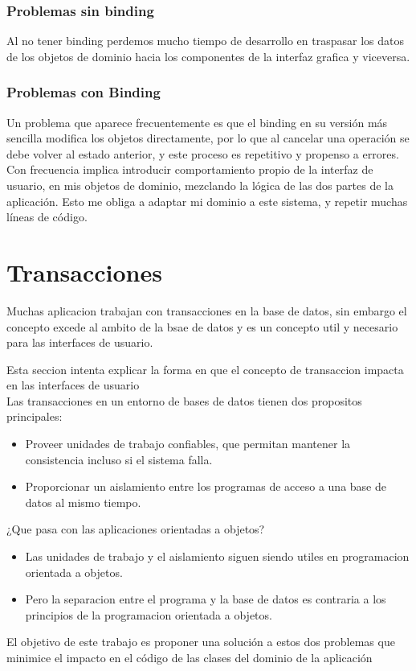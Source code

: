 \subsubsection{Problemas sin binding}
Al no tener binding perdemos mucho tiempo de desarrollo en  traspasar los datos
de los objetos de dominio hacia los componentes de la interfaz grafica y
viceversa.

\subsubsection{Problemas con Binding}
Un problema que aparece frecuentemente es que el binding en su versión más 
sencilla modifica los objetos directamente, por lo que al cancelar una operación 
se debe volver al estado anterior, y este proceso es repetitivo y propenso a errores. 
Con frecuencia implica introducir comportamiento propio de la interfaz de
usuario, en mis objetos de dominio, mezclando la lógica de las dos partes de
la aplicación. Esto me obliga a adaptar mi dominio a este sistema, y repetir
muchas líneas de código.
	
\section{Transacciones}	

{ Muchas aplicacion trabajan con transacciones en la base de datos, sin embargo
el concepto excede al ambito de la bsae de datos y es un concepto util y
necesario para las interfaces de usuario.} 

Esta seccion intenta explicar la forma en que el concepto de transaccion
impacta en las interfaces de usuario\\

Las transacciones en un entorno de bases de datos tienen dos propositos
principales:

\begin {itemize}

  \item	
  Proveer unidades de trabajo confiables, que permitan mantener la consistencia
  incluso si el sistema falla.
  
  \item
  Proporcionar un aislamiento entre los programas de acceso a una base de datos
  al mismo tiempo.
  
\end{itemize}

¿Que pasa con las aplicaciones orientadas a objetos?
\begin {itemize}

  \item
  	Las unidades de trabajo y el aislamiento siguen siendo utiles en programacion
  	orientada a objetos.
  	
  \item
  	Pero la separacion entre el programa y la base de datos es contraria a los
  	principios de la programacion orientada a objetos.
\end{itemize}	

El objetivo de este trabajo es proponer una solución a estos dos problemas que
minimice el impacto en el código de las clases del dominio de la aplicación


